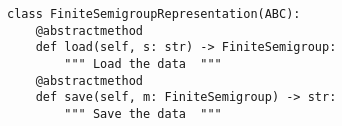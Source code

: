 \begin{verbatim}
class FiniteSemigroupRepresentation(ABC):
    @abstractmethod
    def load(self, s: str) -> FiniteSemigroup:
        """ Load the data  """
    @abstractmethod
    def save(self, m: FiniteSemigroup) -> str:
        """ Save the data  """
\end{verbatim}